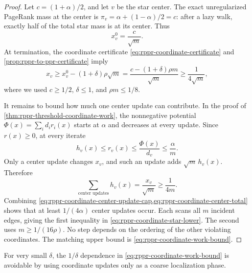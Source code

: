 \begin{proof}
Let \(c=(1+\alpha)/2\), and let \(v\) be the star center.  The exact
unregularized PageRank mass at the center is
\(\pi_v=\alpha+(1-\alpha)/2=c\): after a lazy walk, exactly half of the
total star mass is at its center.  Thus
\begin{equation}
    x_v^0=\frac{c}{\sqrt m}.
    \label{eq:rppr-coordinate-star-ppr-center}
\end{equation}
At termination, the coordinate certificate
\cref{eq:rppr-coordinate-certificate} and
\cref{prop:rppr-to-ppr-certificate} imply
\begin{equation}
    x_v
    \geq
    x_v^0-(1+\delta)\rho\sqrt m
    =
    \frac{c-(1+\delta)\rho m}{\sqrt m}
    \geq\frac{1}{4\sqrt m},
    \label{eq:rppr-coordinate-center-progress}
\end{equation}
where we used \(c\geq1/2\), \(\delta\leq1\), and
\(\rho m\leq1/8\).

It remains to bound how much one center update can contribute.  In the proof
of \cref{thm:rppr-threshold-coordinate-work}, the nonnegative potential
\(\Phi(x)=\sum_i d_i r_i(x)\) starts at \(\alpha\) and decreases at every
update.  Since \(r(x)\geq0\), at every iterate
\begin{equation}
    h_v(x)\leq r_v(x)\leq\frac{\Phi(x)}{d_v}
    \leq\frac{\alpha}{m}.
    \label{eq:rppr-coordinate-center-update-cap}
\end{equation}
Only a center update changes \(x_v\), and such an update adds
\(\sqrt m\,h_v(x)\).  Therefore
\begin{equation}
    \sum_{\text{center updates}}h_v(x)
    =\frac{x_v}{\sqrt m}
    \geq\frac1{4m}.
    \label{eq:rppr-coordinate-center-total}
\end{equation}
Combining
\cref{eq:rppr-coordinate-center-update-cap,eq:rppr-coordinate-center-total}
shows that at least \(1/(4\alpha)\) center updates occur.  Each scans all
\(m\) incident edges, giving the first inequality in
\cref{eq:rppr-coordinate-star-lower}.  The second uses
\(m\geq1/(16\rho)\).  No step depends on the ordering of the other violating
coordinates.  The matching upper bound is
\cref{eq:rppr-coordinate-work-bound}.
\end{proof}

For very small \(\delta\), the \(1/\delta\) dependence in
\cref{eq:rppr-coordinate-work-bound} is avoidable by using coordinate updates
only as a coarse localization phase.

